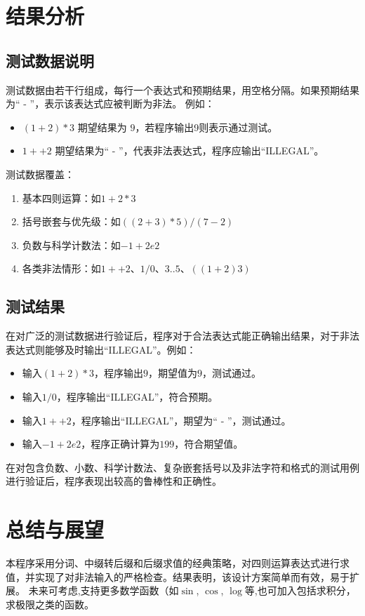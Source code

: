 \documentclass[UTF8]{ctexart}
\begin{document}
\section{结果分析}
\subsection{测试数据说明}
测试数据由若干行组成，每行一个表达式和预期结果，用空格分隔。如果预期结果为“ - ”，表示该表达式应被判断为非法。
例如：
\begin{itemize}
    \item $(1+2)*3$ 期望结果为 $9$，若程序输出9则表示通过测试。
    \item $1++2$ 期望结果为“ - ”，代表非法表达式，程序应输出“ILLEGAL”。
\end{itemize}

测试数据覆盖：
\begin{enumerate}
    \item 基本四则运算：如$1+2*3$
    \item 括号嵌套与优先级：如$((2+3)*5)/(7-2)$
    \item 负数与科学计数法：如$-1+2e2$
    \item 各类非法情形：如$1++2$、$1/0$、$3..5$、$((1+2)3)$
\end{enumerate}

\subsection{测试结果}
在对广泛的测试数据进行验证后，程序对于合法表达式能正确输出结果，对于非法表达式则能够及时输出“ILLEGAL”。例如：
\begin{itemize}
    \item 输入$(1+2)*3$，程序输出$9$，期望值为$9$，测试通过。
    \item 输入$1/0$，程序输出“ILLEGAL”，符合预期。
    \item 输入$1++2$，程序输出“ILLEGAL”，期望为“ - ”，测试通过。
    \item 输入$-1+2e2$，程序正确计算为$199$，符合期望值。
\end{itemize}

在对包含负数、小数、科学计数法、复杂嵌套括号以及非法字符和格式的测试用例进行验证后，程序表现出较高的鲁棒性和正确性。

\section{总结与展望}
本程序采用分词、中缀转后缀和后缀求值的经典策略，对四则运算表达式进行求值，并实现了对非法输入的严格检查。结果表明，该设计方案简单而有效，易于扩展。  
未来可考虑,支持更多数学函数（如$\sin$, $\cos$, $\log$等,也可加入包括求积分，求极限之类的函数。
\end{document}
